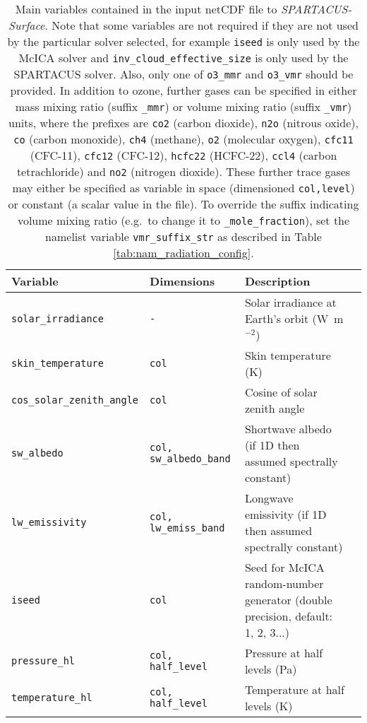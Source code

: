 \documentclass[a4,oneside]{article}
\def\tablesetup{\rowcolors{2}{light-gray}{light-gray}\footnotesize}
\def\codesize{\small}
\def\codetabsize{\footnotesize}
\def\spsurf{\emph{SPARTACUS-Surface}}
\def\code#1{{\codesize\texttt{#1}}}
\def\codetab#1{{\codetabsize\texttt{#1}}}
\begin{document}
\begin{center}
\tablesetup
\begin{longtable}{llLp{6.6cm}}%
\caption{\label{tab:invar}Main variables contained in the input netCDF
  file to \spsurf. Note that some variables are not required if they
  are not used by the particular solver selected, for example
  \code{iseed} is only used by the McICA solver and
  \code{inv\_cloud\_effective\_size} is only used by the SPARTACUS
  solver. Also, only one of \code{o3\_mmr} and \code{o3\_vmr} should
  be provided. In addition to ozone, further gases can be specified in
  either mass mixing ratio (suffix \code{\_mmr}) or volume mixing
  ratio (suffix \code{\_vmr}) units, where the prefixes are \code{co2}
  (carbon dioxide), \code{n2o} (nitrous oxide), \code{co} (carbon
  monoxide), \code{ch4} (methane), \code{o2} (molecular oxygen),
  \code{cfc11} (CFC-11), \code{cfc12} (CFC-12), \code{hcfc22}
  (HCFC-22), \code{ccl4} (carbon tetrachloride) and \code{no2}
  (nitrogen dioxide). These further trace gases may either be
  specified as variable in space (dimensioned \code{col,level}) or
  constant (a scalar value in the file). To override the suffix
  indicating volume mixing ratio (e.g.\ to change it to
  \code{\_mole\_fraction}), set the namelist variable
  \code{vmr\_suffix\_str} as described in Table
  \ref{tab:nam_radiation_config}.}\\
%
\hline
Variable & Dimensions & Description \\
\hline
\codetab{solar\_irradiance} & \codetab{-} & Solar irradiance at Earth's orbit (W~m$^{-2}$) \\
\codetab{skin\_temperature} & \codetab{col} & Skin temperature (K) \\
\codetab{cos\_solar\_zenith\_angle} & \codetab{col} & Cosine of solar zenith angle \\
\codetab{sw\_albedo} & \codetab{col, sw\_albedo\_band} & Shortwave albedo (if 1D then assumed spectrally constant) \\
\codetab{lw\_emissivity} & \codetab{col, lw\_emiss\_band} & Longwave emissivity (if 1D then assumed spectrally constant)\\
\codetab{iseed} & \codetab{col} & Seed for McICA random-number generator (double precision, default: 1, 2, 3...)\\
\codetab{pressure\_hl} & \codetab{col, half\_level} & Pressure at half levels (Pa) \\
\codetab{temperature\_hl}& \codetab{col, half\_level} & Temperature at half levels (K) \\

\end{longtable}
\end{center}
\end{document}
